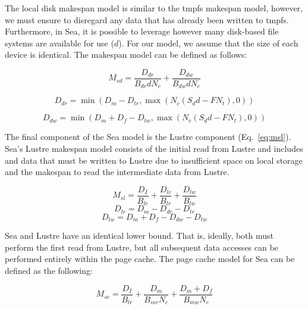 \documentclass{report}
\begin{document}
    The local disk  makespan model is similar to the tmpfs makespan model, however, we
    must ensure to disregard any data that has already been written to tmpfs.
    Furthermore, in Sea, it is possible to leverage however many disk-based
    file systems are available for use ($d$). For our model, we assume that the
    size of each device is identical. 
    The makespan model can be defined as follows:

    \begin{equation}\label{eq:msd}
        M_{sd} =  \frac{D_{dr}}{B_{dr}dN_{c}} + \frac{D_{dw}}{B_{dw}dN_{c}}
    \end{equation}

    \begin{equation}\label{eq:ddr}
        D_{dr} = \min{(D_{m} - D_{tr}, \max{(N_{c}(S_{d}d - FN_{t}),0)})}
    \end{equation}

    \begin{equation}\label{eq:ddw}
        D_{dw} = \min{(D_{m} + D_{f} - D_{tw}, \max{(N_{c}(S_{d}d - FN_{t}),0)})}
    \end{equation}


    The final component of the Sea model is the Lustre component (Eq.~\ref{eq:msl}). Sea's Lustre
    makespan model consists of the initial read from Lustre and includes and
    data that must be written to Lustre due to insufficient space on local
    storage and the makespan to read the intermediate data from Lustre.

    \begin{equation}\label{eq:msl}
        M_{sl} = \frac{D_{I}}{B_{lr}} + \frac{D_{lr}}{B_{lr}} + \frac{D_{lw}}{B_{lw}}
    \end{equation}
    \begin{equation}\label{eq:dlr}
        D_{lr} = D_{m} - D_{dr} - D_{tr}
    \end{equation}
    \begin{equation}\label{eq:dlw}
        D_{lw} = D_{m} + D_{f} - D_{dw} - D_{tw}
    \end{equation}

    Sea and Lustre have an identical lower bound. That is, ideally, both must
    perform the first read from Lustre, but all subsequent data accesses can
    be performed entirely within the page cache. The page cache model for Sea
    can be defined as the following:

    \begin{equation}\label{eq:msc}
        M_{sc} = \frac{D_{I}}{B_{lr}} + \frac{D_{m}}{B_{mr}N_{c}} + \frac{D_{m} + D_{f}}{B_{mw}N_{c}}
    \end{equation}
\end{document}
